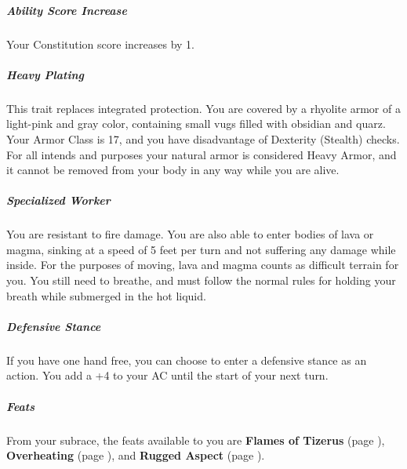     \subparagraph{Ability Score Increase} Your Constitution score increases by 1.

    \subparagraph{Heavy Plating} This trait replaces integrated protection.
    You are covered by a rhyolite armor of a light-pink and gray color, containing small vugs filled with obsidian and quarz.
    Your Armor Class is 17, and you have disadvantage of Dexterity (Stealth) checks.
    For all intends and purposes your natural armor is considered Heavy Armor, and it cannot be removed from your body in any way while you are alive.

    \subparagraph{Specialized Worker} You are resistant to fire damage.
    You are also able to enter bodies of lava or magma, sinking at a speed of 5 feet per turn and not suffering any damage while inside.
    For the purposes of moving, lava and magma counts as difficult terrain for you.
    You still need to breathe, and must follow the normal rules for holding your breath while submerged in the hot liquid.

    \subparagraph{Defensive Stance} If you have one hand free, you can choose to enter a defensive stance as an action.
    You add a +4 to your AC until the start of your next turn.

    \subparagraph{Feats} From your subrace, the feats available to you are
    \textbf{Flames of Tizerus} (page \pageref{feat::flamesoftizerus}),
    \textbf{Overheating} (page \pageref{feat::overheating}), and
    \textbf{Rugged Aspect} (page \pageref{feat::ruggedaspect}).
